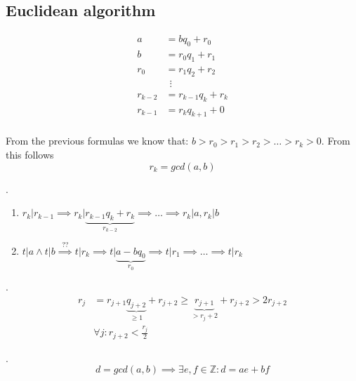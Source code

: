 

\subsection{Euclidean algorithm}
\begin{align*}
  a &= b q_0 +r_0 \\
  b &= r_0 q_1 + r_1 \\
  r_0 &= r_1 q_2 + r_2\\
  &~~\vdots\\
  r_{k-2} &= r_{k-1}  q_k + r_k \\
  r_{k-1} &= r_{k}  q_{k+1} + 0 \\
\end{align*}

From the previous formulas we know that: $b > r_0 > r_1 > r_2 > \ldots > r_k > 0$. From this follows
\[
  r_k = gcd(a,b)
\]

\Proof.
\begin{enumerate}[1)]
  \item $r_k | r_{k-1} \implies r_k | \underbrace{r_{k-1} q_k + r_k}_{r_{k-2}}
         \implies \ldots \implies r_k | a, r_k | b$ \\
  \item $t | a \wedge t | b \stackrel{\text{??}}{\implies} t| r_k
         \implies t | \underbrace{a-bq_0}_{r_0} \implies t | r_1
         \implies \ldots \implies t|r_k$
\end{enumerate}

\Remark.
\begin{align*}
  r_j &= r_{j + 1} \underbrace{q_{j+2}}_{ \geq 1} + r_{j+2} \geq \underbrace{r_{j+1}}_{ > r_j+2} + r_{j+2} > 2 r_{j+2} \\
      & \forall j: r_{j+2} < \frac{r_j}{2}
\end{align*}

\Theorem.
\[
  d = gcd(a,b) \implies \exists e,f \in \mathbb{Z}: d = ae + bf
\]

